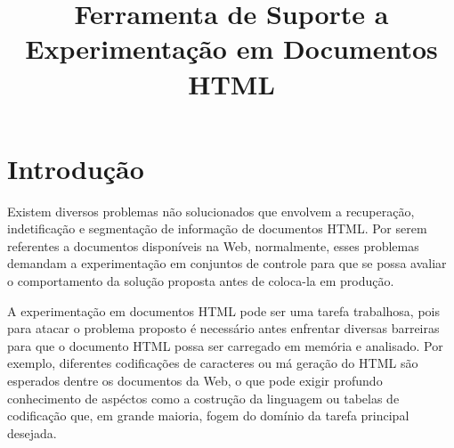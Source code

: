 \documentclass[12pt, a4paper]{article}
\begin{document}
\title{Ferramenta de Suporte a Experimentação em Documentos HTML}

\maketitle


\section{Introdução}


Existem diversos problemas não solucionados que envolvem a
recuperação, indetificação e segmentação de 
informação de documentos HTML. Por serem referentes a documentos disponíveis
na Web, normalmente, esses problemas demandam a
experimentação em conjuntos de controle para que se possa avaliar o
comportamento da solução proposta antes de coloca-la em produção.


A experimentação em documentos HTML pode ser uma tarefa trabalhosa, pois
para atacar o problema proposto é necessário antes enfrentar diversas
barreiras para que o documento HTML possa ser carregado em memória e
analisado. Por exemplo, diferentes codificações de caracteres ou má geração do
HTML são esperados dentre os documentos da Web, o que pode 
exigir profundo conhecimento de aspéctos como a costrução da linguagem ou
tabelas de codificação que, em grande maioria, fogem do domínio da tarefa
principal desejada.


\end{document}

